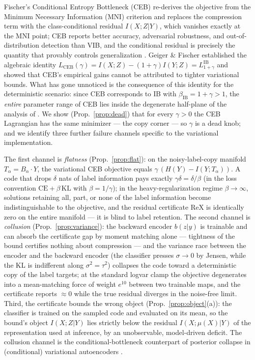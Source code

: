 Fischer's Conditional Entropy Bottleneck (CEB) \cite{fischer2020conditional} re-derives
the objective from the Minimum Necessary Information (MNI) criterion and replaces the
compression term with the class-conditional residual $I(X;Z|Y)$, which vanishes exactly at
the MNI point; CEB reports better accuracy, adversarial robustness, and out-of-distribution
detection than VIB, and the conditional residual is precisely the quantity that provably
controls generalization \cite{kawaguchi2023how}. Geiger \& Fischer
\cite{geiger2020comparison} established the algebraic identity
$L_{\mathrm{CEB}}(\gamma) = I(X;Z) - (1+\gamma)I(Y;Z) = L^{\mathrm{IB}}_{1+\gamma}$ and
showed that CEB's empirical gains cannot be attributed to tighter variational bounds.
What has gone unnoticed is the consequence of this identity for the deterministic
scenario: since CEB corresponds to IB with $\beta_{\mathrm{IB}} = 1 + \gamma > 1$, the
\emph{entire} parameter range of CEB lies inside the degenerate half-plane of the analysis
of \cite{kolchinsky2019caveats}. We show (Prop.~\ref{prop:dead}) that for every
$\gamma > 0$ the CEB Lagrangian has the same minimizer --- the copy corner --- so $\gamma$
is a dead knob; and we identify three further failure channels specific to the
variational implementation.

The first channel is \emph{flatness} (Prop.~\ref{prop:flat}): on the noisy-label-copy
manifold $T_\alpha = B_\alpha \cdot Y$, the variational CEB objective equals
$\gamma\,(H(Y) - I(Y;T_\alpha))$. A code that drops $\delta$ nats of label information
pays exactly $\gamma\delta = \delta/\beta$ (in the loss convention
$\mathrm{CE} + \beta\,\mathrm{KL}$ with $\beta = 1/\gamma$); in the heavy-regularization
regime $\beta \to \infty$, solutions retaining all, part, or none of the label information
become indistinguishable to the objective, and the residual certificate $\mathrm{ReX}$ is
identically zero on the entire manifold --- it is blind to label retention. The second
channel is \emph{collusion} (Prop.~\ref{prop:variance}): the backward encoder $b(z|y)$ is
trainable and can absorb the certificate gap by moment matching alone --- tightness of the
bound certifies nothing about compression --- and the variance race between the encoder
and the backward encoder (the classifier presses $\sigma \to 0$ by Jensen, while the KL is
indifferent along $\sigma^2 = \tau^2$) collapses the code toward a deterministic copy of
the label targets; at the standard logvar clamp the objective degenerates into a
mean-matching force of weight $e^{10}$ between two trainable maps, and the certificate
reports $\approx 0$ while the true residual diverges in the noise-free limit. Third, the
certificate bounds the wrong object (Prop.~\ref{prop:object}(a)): the classifier is
trained on the sampled code and evaluated on its mean, so the bound's object
$I(X;Z|Y)$ lies strictly below the residual $I(X;\mu(X)|Y)$ of the representation used at
inference, by an unobservable, model-driven deficit. The collusion channel is the
conditional-bottleneck counterpart of posterior collapse in (conditional) variational
autoencoders \cite{dai2020usual,dang2024beyond}.

